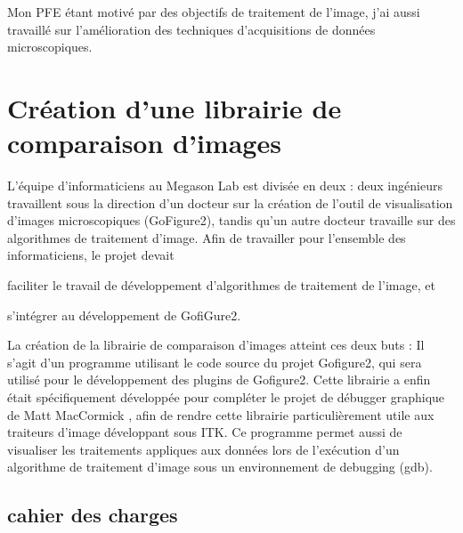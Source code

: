 Mon PFE étant motivé par des objectifs de traitement de l'image, j'ai aussi travaillé sur l'amélioration
 des techniques d'acquisitions de données microscopiques.







\section{Création d'une librairie de comparaison d'images}

L'équipe d'informaticiens au Megason Lab est divisée en deux : deux ingénieurs travaillent sous la direction d'un docteur sur la
 création de l'outil de visualisation d'images microscopiques (GoFigure2), tandis qu'un autre docteur travaille sur
 des algorithmes de traitement d'image. Afin de travailler pour l'ensemble des informaticiens, le projet devait
\begin{inparaenum}[(i)]
  \item faciliter le travail de développement d'algorithmes de traitement de l'image, et 
  \item s'intégrer au développement de GofiGure2.
\end{inparaenum}

La création de la librairie de comparaison d'images atteint ces deux buts : 
Il s'agit d'un programme utilisant le code source du projet Gofigure2, 
qui sera utilisé pour le développement des plugins de Gofigure2.
Cette librairie a enfin était spécifiquement développée pour compléter le projet de débugger graphique de 
Matt MacCormick \cite{McCornic-VisualDebug}, afin de rendre cette librairie particulièrement utile
aux traiteurs d'image développant sous ITK.
Ce programme permet aussi de visualiser les traitements appliques aux données
lors de l'exécution d'un algorithme de traitement d'image sous un environnement de debugging (gdb).


\subsection{cahier des charges}


